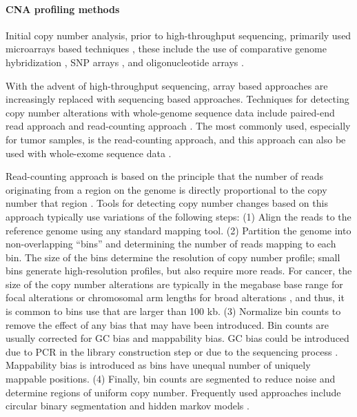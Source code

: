 

\paragraph{CNA profiling methods}
Initial copy number analysis, prior to high-throughput sequencing,
primarily used microarrays based techniques \citep{carter2007methods},
these include the use of comparative genome hybridization
\citep{pinkel1998high}, SNP arrays \citep{nannya2005robust}, and
oligonucleotide arrays \citep{lucito2003representational}.

With the advent of high-throughput sequencing, array based approaches
are increasingly replaced with sequencing based approaches.  Techniques
for detecting copy number alterations with whole-genome sequence data
include paired-end read approach \citep{korbel2007paired} and
read-counting approach \citep{yoon2009sensitive}.  The most commonly
used, especially for tumor samples, is the read-counting approach, and
this approach can also be used with whole-exome sequence data
\citep{krumm2012copy,d2016enhanced}.

Read-counting approach is based on the principle that the number of
reads originating from a region on the genome is directly proportional
to the copy number that region \citep{baslan2015optimizing}.
%
Tools for detecting copy number changes based on this approach typically
use variations of the following steps:
%
(1) Align the reads to the reference genome using any standard mapping
tool.
%
(2) Partition the genome into non-overlapping ``bins'' and determining
the number of reads mapping to each bin. The size of the bins determine
the resolution of copy number profile; small bins generate
high-resolution profiles, but also require more reads. For cancer, the
size of the copy number alterations are typically in the megabase base
range for focal alterations or chromosomal arm lengths for broad
alterations \citep{beroukhim2010landscape}, and thus, it is common to
bins use that are larger than 100 kb.
%
(3) Normalize bin counts to remove the effect of any bias that may have
been introduced. Bin counts are usually corrected for GC bias and
mappability bias. GC bias could be introduced due to PCR in the library
construction step or due to the sequencing process
\citep{aird2011analyzing,benjamini2012summarizing}. Mappability bias is
introduced as bins have unequal number of uniquely mappable positions.
%
(4) Finally, bin counts are segmented to reduce noise and determine
regions of uniform copy number. Frequently used approaches include
circular binary segmentation
\citep{olshen2004circular,venkatraman2007faster} and hidden markov
models \citep{ha2014titan}.

